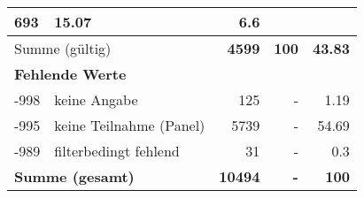 \begin{longtable}{lXrrr}
       \num{693} &
       \num[round-mode=places,round-precision=2]{15,07} &
         \num[round-mode=places,round-precision=2]{6,6} \\
     \midrule
     \multicolumn{2}{l}{Summe (gültig)} &
       \textbf{\num{4599}} &
     \textbf{100} &
       \textbf{\num[round-mode=places,round-precision=2]{43,83}} \\
     \multicolumn{5}{l}{\textbf{Fehlende Werte}}\\
       -998 &
       keine Angabe &
         \num{125} &
        - &
         \num[round-mode=places,round-precision=2]{1,19} \\
       -995 &
       keine Teilnahme (Panel) &
         \num{5739} &
        - &
         \num[round-mode=places,round-precision=2]{54,69} \\
       -989 &
       filterbedingt fehlend &
         \num{31} &
        - &
         \num[round-mode=places,round-precision=2]{0,3} \\
     \midrule
     \multicolumn{2}{l}{\textbf{Summe (gesamt)}} &
          \textbf{\num{10494}} &
        \textbf{-} &
        \textbf{100} \\
     \bottomrule
     \end{longtable}
     
